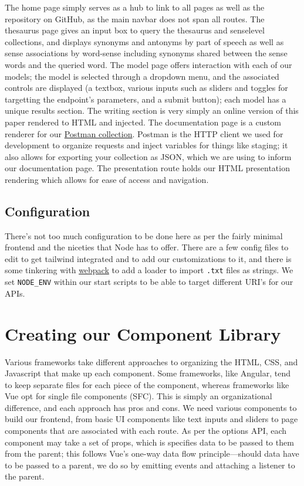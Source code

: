 \documentclass[11pt, twoside, reqno]{book}
\begin{document}
The home page simply serves as a hub to link to all pages as well as the repository on GitHub, as the main navbar does not span all routes. The thesaurus page gives an input box to query the thesaurus and senselevel collections, and displays synonyms and antonyms by part of speech as well as sense associations by word-sense including synonyms shared between the sense words and the queried word. The model page offers interaction with each of our models; the model is selected through a dropdown menu, and the associated controls are displayed (a textbox, various inputs such as sliders and toggles for targetting the endpoint's parameters, and a submit button); each model has a unique results section. The writing section is very simply an online version of this paper rendered to HTML and injected. The documentation page is a custom renderer for our \href{https://www.postman.com/}{Postman collection}. Postman is the HTTP client we used for development to organize requests and inject variables for things like staging; it also allows for exporting your collection as JSON, which we are using to inform our documentation page. The presentation route holds our HTML presentation rendering which allows for ease of access and navigation.

\subsection{Configuration}

There's not too much configuration to be done here as per the fairly minimal frontend and the niceties that Node has to offer. There are a few config files to edit to get tailwind integrated and to add our customizations to it, and there is some tinkering with \href{https://webpack.js.org/}{webpack} to add a loader to import \texttt{.txt} files as strings. We set \texttt{NODE\_ENV} within our start scripts to be able to target different URI's for our APIs.

\section{Creating our Component Library}


Various frameworks take different approaches to organizing the HTML, CSS, and Javascript that make up each component. Some frameworks, like Angular, tend to keep separate files for each piece of the component, whereas frameworks like Vue opt for single file components (SFC). This is simply an organizational difference, and each approach has pros and cons. We need various components to build our frontend, from basic UI components like text inputs and sliders to page components that are associated with each route. As per the options API, each component may take a set of \textit{}props\textit{}, which is specifies data to be passed to them from the parent; this follows Vue's one-way data flow principle—should data have to be passed to a parent, we do so by emitting events and attaching a listener to the parent.
\end{document}
